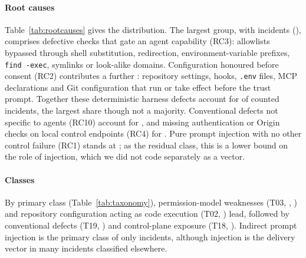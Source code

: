 \paragraph*{Root causes} Table~\ref{tab:rootcauses} gives the distribution. The largest group, with \nIncRCThree{} incidents (\pctRCThree{}), comprises defective checks that gate an agent capability (RC3): allowlists bypassed through shell substitution, redirection, environment-variable prefixes, \texttt{find -exec}, symlinks or look-alike domains. Configuration honoured before consent (RC2) contributes a further \nIncRCTwo{}: repository settings, hooks, \texttt{.env} files, MCP declarations and Git configuration that run or take effect before the trust prompt. Together these deterministic harness defects account for \pctRCTwoThree{} of counted incidents, the largest share though not a majority. Conventional defects not specific to agents (RC10) account for \pctRCTen{}, and missing authentication or Origin checks on local control endpoints (RC4) for \nIncRCFour{}. Pure prompt injection with no other control failure (RC1) stands at \pctRCOne{}; as the residual class, this is a lower bound on the role of injection, which we did not code separately as a vector.

\begin{table}[!t]
\centering\footnotesize
\caption{Root causes of the counted 2025--2026 harness incidents (RQ3), assigned by the ordered procedure. Primary taxonomy classes are given in Table~\ref{tab:taxonomy}.}
\label{tab:rootcauses}
\resizebox{\columnwidth}{!}{}
\end{table}

\paragraph*{Classes} By primary class (Table~\ref{tab:taxonomy}), permission-model weaknesses (T03, \nIncTopThree{}, \pctTopThree{}) and repository configuration acting as code execution (T02, \nIncTopTwo{}) lead, followed by conventional defects (T19, \nIncTNineteen{}) and control-plane exposure (T18, \nIncTEighteen{}). Indirect prompt injection is the primary class of only \nIncTOne{} incidents, although injection is the delivery vector in many incidents classified elsewhere.

